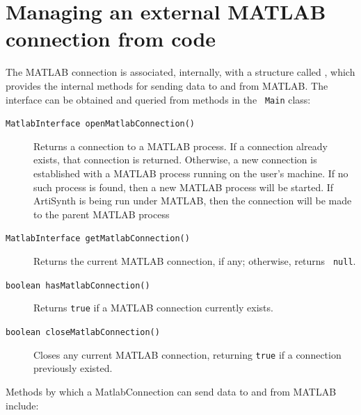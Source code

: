 \documentclass{article}
\begin{document}
\section{Managing an external MATLAB connection from code}
\label{MatlabFromCode:sec}

The MATLAB connection is associated, internally, with a structure
called , which
provides the internal methods for sending data to and from MATLAB.
The interface can be obtained and queried from methods in the {\tt
Main} class:

\begin{description}

\item[{\tt MatlabInterface openMatlabConnection()}] \mbox{}

Returns a connection to a MATLAB process. If a connection already
exists, that connection is returned. Otherwise, a new connection is
established with a MATLAB process running on the user's machine.  If
no such process is found, then a new MATLAB process will be
started. If ArtiSynth is being run under MATLAB, then the connection
will be made to the parent MATLAB process

\item[{\tt MatlabInterface getMatlabConnection()}] \mbox{}

Returns the current MATLAB connection, if any; otherwise, returns {\tt
null}.

\item[{\tt boolean hasMatlabConnection()}] \mbox{}

Returns {\tt true} if a MATLAB connection currently exists.

\item[{\tt boolean closeMatlabConnection()}] \mbox{}

Closes any current MATLAB connection, returning {\tt true} if a
connection previously existed.

\end{description}

Methods by which a MatlabConnection can send data to and from MATLAB
include:
\end{document}
